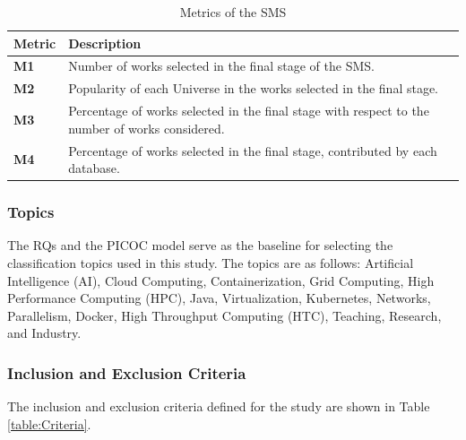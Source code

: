 \begin{table}[htbp]
	\centering
	\caption{Metrics of the SMS}
	\label{table:Metrics}
	\renewcommand{\arraystretch}{1}  %
	\begin{tabular}{p{1cm}p{6.8cm}}
		\toprule
		\textbf{Metric} & \textbf{Description}                                                                            \\
		\midrule
		\textbf{M1}     & Number of works selected in the final stage of the SMS.                                         \\
		\addlinespace[0.8em]
		\textbf{M2}     & Popularity of each Universe in the works selected in the final stage.                           \\
		\addlinespace[0.8em]
		\textbf{M3}     & Percentage of works selected in the final stage with respect to the number of works considered. \\
		\addlinespace[0.8em]
		\textbf{M4}     & Percentage of works selected in the final stage, contributed by each database.                  \\
		\bottomrule
	\end{tabular}
\end{table}

\subsubsection{Topics}
The RQs and the PICOC model serve as the baseline for selecting the classification topics used in this study. The topics are as follows: Artificial Intelligence (AI), Cloud Computing, Containerization, Grid Computing, High Performance Computing (HPC), Java, Virtualization, Kubernetes, Networks, Parallelism, Docker, High Throughput Computing (HTC), Teaching, Research, and Industry.

\subsubsection{Inclusion and Exclusion Criteria}
The inclusion and exclusion criteria defined for the study are shown in Table \ref{table:Criteria}.

